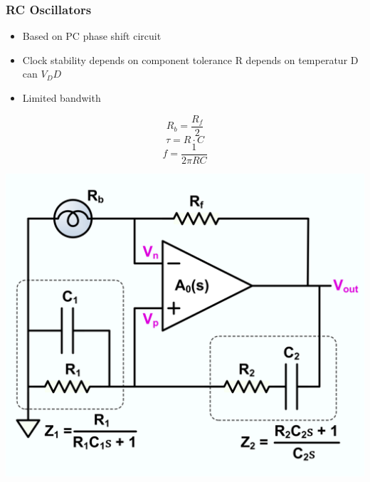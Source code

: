 \subsubsection{RC Oscillators}
\vspace{-1cm}
\begin{minipage}{0.5\linewidth}
\begin{itemize}
    \item Based on PC phase shift circuit
    \item Clock stability depends on component tolerance
        \subitem R depends on temperatur
        \subitem D can $ V_DD $
    \item Limited bandwith   
\end{itemize}
\[ R_b = \dfrac{R_f}{2} \]
\[ \tau=R\cdot C \]
\[ f = \dfrac{1}{2 \pi RC} \]
\end{minipage}
\begin{minipage}{0.5\linewidth}
    \includegraphics[width=\linewidth]{images/RCOscillator} 
\end{minipage}

